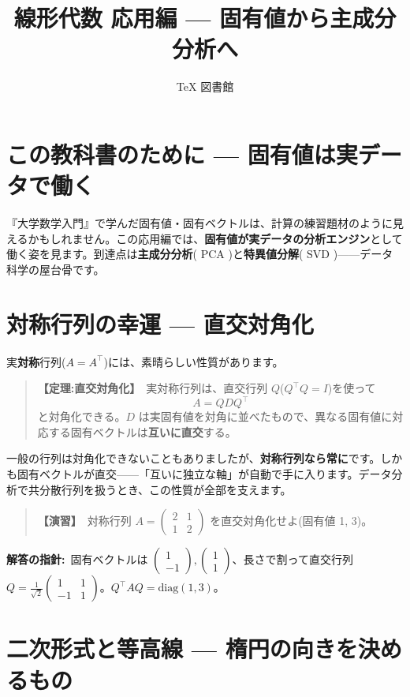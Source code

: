\documentclass{article}
\title{線形代数 応用編 — 固有値から主成分分析へ}
\author{TeX 図書館}
\begin{document}
\section{この教科書のために — 固有値は実データで働く}

『大学数学入門』で学んだ固有値・固有ベクトルは、計算の練習題材のように見えるかもしれません。この応用編では、\textbf{固有値が実データの分析エンジン}として働く姿を見ます。到達点は\textbf{主成分分析}( PCA )と\textbf{特異値分解}( SVD )——データ科学の屋台骨です。

\section{対称行列の幸運 — 直交対角化}

実\textbf{対称}行列(\(A = A^{\top}\))には、素晴らしい性質があります。

\begin{quote}
\textbf{【定理:直交対角化】}\ 実対称行列は、直交行列 \(Q\)(\(Q^{\top}Q = I\))を使って
\[ A = Q D Q^{\top} \]
と対角化できる。\(D\) は実固有値を対角に並べたもので、異なる固有値に対応する固有ベクトルは\textbf{互いに直交}する。
\end{quote}

一般の行列は対角化できないこともありましたが、\textbf{対称行列なら常に}です。しかも固有ベクトルが直交——「互いに独立な軸」が自動で手に入ります。データ分析で共分散行列を扱うとき、この性質が全部を支えます。

\begin{quote}
\textbf{【演習】}\ 対称行列 \(A = \begin{pmatrix} 2 & 1 \\ 1 & 2 \end{pmatrix}\) を直交対角化せよ(固有値 1, 3)。
\end{quote}

\textbf{解答の指針:}\ 固有ベクトルは \(\begin{pmatrix}1\\-1\end{pmatrix}, \begin{pmatrix}1\\1\end{pmatrix}\)、長さで割って直交行列 \(Q = \frac{1}{\sqrt{2}}\begin{pmatrix} 1 & 1 \\ -1 & 1 \end{pmatrix}\)。\(Q^{\top}AQ = \mathrm{diag}(1, 3)\)。

\section{二次形式と等高線 — 楕円の向きを決めるもの}
\end{document}
